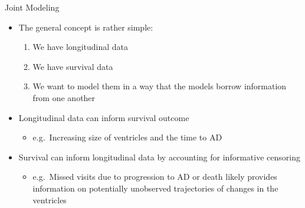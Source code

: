 \documentclass[
  ignorenonframetext,
]{beamer}
\providecommand{\tightlist}{%
  \setlength{\itemsep}{0pt}\setlength{\parskip}{0pt}}
\begin{document}
\begin{frame}{Joint Modeling}
\protect\hypertarget{joint-modeling}{}
\begin{itemize}
\tightlist
\item
  The general concept is rather simple:

  \begin{enumerate}
  \tightlist
  \item
    We have longitudinal data
  \item
    We have survival data
  \item
    We want to model them in a way that the models borrow information
    from one another
  \end{enumerate}
\item
  Longitudinal data can inform survival outcome

  \begin{itemize}
  \tightlist
  \item
    e.g.~Increasing size of ventricles and the time to AD
  \end{itemize}
\item
  Survival can inform longitudinal data by accounting for informative
  censoring

  \begin{itemize}
  \tightlist
  \item
    e.g.~Missed visits due to progression to AD or death likely provides
    information on potentially unobserved trajectories of changes in the
    ventricles
  \end{itemize}
\end{itemize}
\end{frame}
\end{document}
